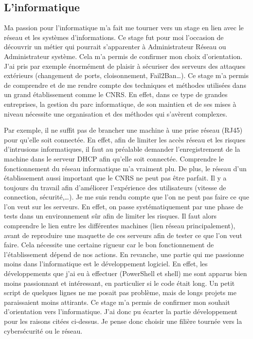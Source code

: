 \subsection{L'informatique}
Ma passion pour l'informatique m'a fait me tourner vers un stage en lien avec le réseau et les systèmes d'informations. 
Ce stage fut pour moi l'occasion de découvrir un métier qui pourrait s'apparenter à Administrateur Réseau ou Administrateur système. Cela m'a permis de confirmer mon choix d'orientation. J'ai pris par exemple énormément de plaisir à sécuriser des serveurs des attaques extérieurs (changement de ports, cloisonnement, Fail2Ban\dots). Ce stage m'a permis de comprendre et de me rendre compte des techniques et méthodes utilisées dans un grand établissement comme le CNRS. En effet, dans ce type de grandes entreprises, la gestion du parc informatique, de son maintien et de ses mises à niveau nécessite une organisation et des méthodes qui s’avèrent complexes.

Par exemple, il ne suffit pas de brancher une machine à une prise réseau (RJ45) pour qu'elle soit connectée. En effet, afin de limiter les accès réseau et les risques d'intrusions informatiques, il faut au préalable demander l'enregistrement de la machine dans le serveur DHCP afin qu'elle soit connectée. Comprendre le fonctionnement du réseau informatique m'a vraiment plu. De plus, le réseau d'un établissement aussi important que le CNRS ne peut pas être parfait. Il y a toujours du travail afin d'améliorer l'expérience des utilisateurs (vitesse de connection, sécurité,\ldots).
\medbreak
Je me suis rendu compte que l'on ne peut pas faire ce que l'on veut sur les serveurs. En effet, on passe systématiquement par une phase de tests dans un environnement sûr afin de limiter les risques. Il faut alors comprendre le lien entre les différentes machines (lien réseau principalement), avant de reproduire une maquette de ces serveurs afin de tester ce que l'on veut faire. Cela nécessite une certaine rigueur car le bon fonctionnement de l'établissement dépend de nos actions.
\medbreak
En revanche, une partie qui me passionne moins dans l'informatique est le développement logiciel. En effet, les développements que j'ai eu à effectuer (PowerShell et shell) me sont apparus bien moins passionnant et intéressant, en particulier si le code était long. Un petit script de quelques lignes ne me posait pas problème, mais de longs projets me paraissaient moins attirants. 
\medbreak
Ce stage m'a permis de confirmer mon souhait d'orientation vers l'informatique. J'ai donc pu écarter la partie développement pour les raisons citées ci-dessus. Je pense donc choisir une filière tournée vers la cybersécurité ou le réseau. 
 
